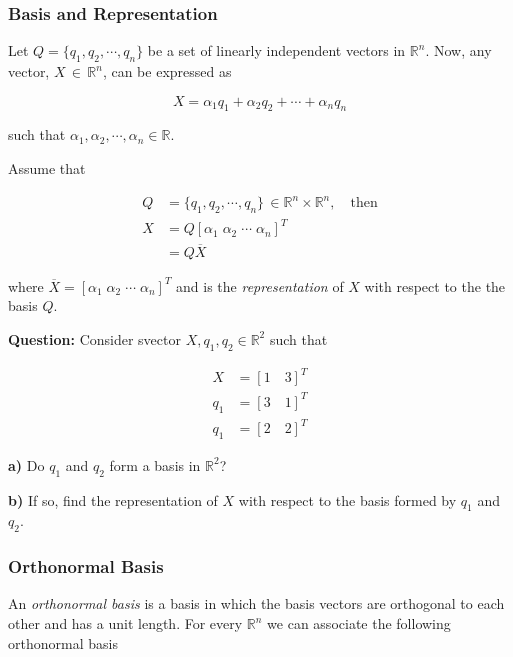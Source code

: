 \subsubsection{Basis and Representation}

Let $Q = \{q_1, q_2, \cdots, q_n \}$ be a set of linearly independent vectors in
$\mathbb{R}^n$. Now, any vector, $X \, \in \, \mathbb{R}^n$, can be expressed
as

\begin{equation} \label{eq:linear_combo_vector}
X = \alpha_1 q_1 + \alpha_2 q_2 + \cdots + \alpha_n q_n
\end{equation}

\noindent such that $\alpha_1, \alpha_2, \cdots, \alpha_n \in \mathbb{R}$.

Assume that

\begin{align}
  Q &= \{q_1, q_2, \cdots, q_n \} \, \in \mathbb{R}^n \times \mathbb{R}^n, \quad \text{then} \\
  X &= Q [\alpha_1 \; \alpha_2 \; \cdots \; \alpha_n]^T \\
    &= Q \overline{X}
\end{align}

\noindent where $\overline{X} = [\alpha_1 \; \alpha_2 \; \cdots \; \alpha_n]^T$
and is the \textit{representation} of $X$ with respect to the the basis $Q$.

\noindent \textbf{Question:} Consider svector $X, q_1, q_2 \in \mathbb{R}^2$
such that

\begin{align}
  X   &= [1 \quad 3]^T \\
  q_1 &= [3 \quad 1]^T \\
  q_1 &= [2 \quad 2]^T
\end{align}

\noindent \textbf{a)} Do $q_1$ and $q_2$ form a basis in $\mathbb{R}^2$?

\noindent \textbf{b)} If so, find the representation of $X$ with respect to the
basis formed by $q_1$ and $q_2$.

\subsubsection{Orthonormal Basis}

An \textit{orthonormal basis} is a basis in which the basis vectors are
orthogonal to each other and has a unit length. For every $\mathbb{R}^n$ we can
associate the following orthonormal basis

